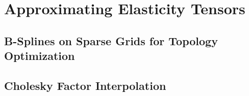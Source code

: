 \section{Approximating Elasticity Tensors}
\label{sec:62tensors}

\blindtext{}

\subsection{B-Splines on Sparse Grids for Topology Optimization}
\label{sec:621BSplines}

\blindtext{}

\subsection{Cholesky Factor Interpolation}
\label{sec:622cholesky}

\blindtext{}















































